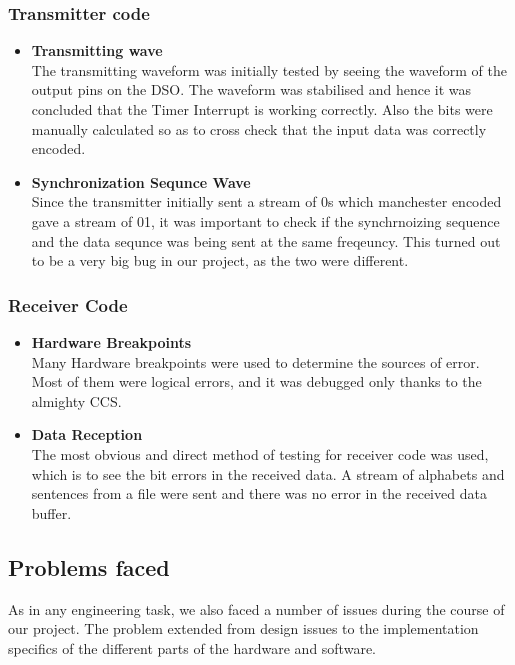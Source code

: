 \documentclass{article}
\begin{document}
\subsubsection{Transmitter code}
\begin{itemize}
\item \textbf{Transmitting wave}\\
  The transmitting waveform was initially tested by seeing the waveform of the output pins on the DSO. The waveform was stabilised and hence it was concluded that the Timer Interrupt is working correctly. Also the bits were manually calculated so as to cross check that the input data was correctly encoded. 
\item \textbf{Synchronization Sequnce Wave}\\
  Since the transmitter initially sent a stream of 0s which manchester encoded gave a stream of 01, it was important to check if the synchrnoizing sequence and the data sequnce was being sent at the same freqeuncy. This turned out to be a very big bug in our project, as the two were different.
\end{itemize}

\subsubsection{Receiver Code}
\begin{itemize}
\item \textbf{Hardware Breakpoints}\\
  Many Hardware breakpoints were used to determine the sources of error. Most of them were logical errors, and it was debugged only thanks to the almighty CCS.
\item \textbf{Data Reception}\\
  The most obvious and direct method of testing for receiver code was used, which is to see the bit errors in the received data. A stream of alphabets and sentences from a file were sent and there was no error in the received data buffer.
\end{itemize}
%  
\subsection{Problems faced}
 As in any engineering task, we also faced a number of issues during the course of our project. The problem extended from design issues to the implementation specifics of the different parts of the hardware and software. 
\end{document}
